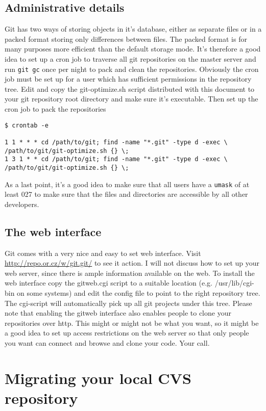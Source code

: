 \documentclass[a4paper,10pt]{article}
\begin{document}
\subsection{Administrative details} 
Git has two ways of storing objects in it's database, either as separate
files or in a packed format storing only differences between files. The packed
format is for many purposes more efficient than the default storage mode. It's
therefore a good idea to set up a cron job to traverse all git repositories on
the master server and run \texttt{git gc} once per night to pack and clean the
repositories. Obviously the cron job must be set up for a user which has
sufficient permissions in the repository tree. Edit and copy the git-optimize.sh
script distributed with this document to your git repository root directory
and make sure it's executable. Then set up the cron job to pack the
repositories
\begin{verbatim}
$ crontab -e

1 1 * * * cd /path/to/git; find -name "*.git" -type d -exec \
/path/to/git/git-optimize.sh {} \;
1 3 1 * * cd /path/to/git; find -name "*.git" -type d -exec \
/path/to/git/git-optimize.sh {} \;
\end{verbatim}

As a last point, it's a good idea to make sure that all users have a
\texttt{umask} of at least 027 to make sure that the files and directories are
accessible by all other developers.

\subsection{The web interface}
Git comes with a very nice and easy to set web interface. Visit 
\url{http://repo.or.cz/w/git.git/} to see it action. I will not discuss how to
set up your web server, since there is ample information available on the web.
To install the web interface copy the gitweb.cgi script to a suitable
location (e.g. /usr/lib/cgi-bin on some systems) and edit the config file to
point to the right repository tree. The cgi-script will automatically pick up
all git projects under this tree. Please note that enabling the gitweb
interface also enables people to clone your repositories over http. This might
or might not be what you want, so it might be a good idea to set up access
restrictions on the web server so that only people you want can connect and
browse and clone your code. Your call.

\section{Migrating your local CVS repository}
\end{document}
